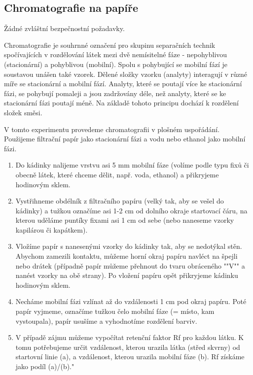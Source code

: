 \subsection{Chromatografie na papíře}


Žádné zvláštní bezpečnostní požadavky.

\hspace{-21px} 

Chromatografie je souhrnné označení pro skupinu separačních technik spočívajících v rozdělování látek mezi dvě nemísitelné fáze - nepohyblivou (stacionární) a pohyblivou (mobilní). Spolu s pohybující se mobilní fází je soustavou unášen také vzorek. Dělené složky vzorku (analyty) interagují v různé míře se stacionární a mobilní fází. Analyty, které se poutají více ke stacionární fázi, se pohybují pomaleji a jsou zadržovány déle, než analyty, které se ke stacionární fázi poutají méně. Na základě tohoto principu dochází k rozdělení složek směsi.

V tomto experimentu provedeme chromatografii v plošném uspořádání. Použijeme filtrační papír jako stacionární fázi a vodu nebo ethanol jako mobilní fázi. \newline

\hspace{-21px} 

\begin{enumerate}
\item Do kádinky nalijeme vrstvu asi 5 mm mobilní fáze (volíme podle typu fixů či obecně látek, které chceme dělit, např. voda, ethanol) a přikryjeme hodinovým sklem.
\item Vystřihneme obdélník z filtračního papíru (velký tak, aby se vešel do kádinky) a tužkou označíme asi 1-2 cm od dolního okraje startovací čáru, na kterou uděláme puntíky fixami asi 1 cm od sebe (nebo naneseme vzorky kapilárou či kapátkem).
\item Vložíme papír s nanesenými vzorky do kádinky tak, aby se nedotýkal stěn. Abychom zamezili kontaktu, můžeme horní okraj papíru navléct na špejli nebo drátek (případně papír můžeme přehnout do tvaru obráceného ""V"" a nanést vzorky na obě strany). Po vložení papíru opět přikryjeme kádinku hodinovým sklem.
\item Necháme mobilní fázi vzlínat až do vzdálenosti 1 cm pod okraj papíru. Poté papír vyjmeme, označíme tužkou čelo mobilní fáze (= místo, kam vystoupala), papír usušíme a vyhodnotíme rozdělení barviv.
\item V případě zájmu můžeme vypočítat retenční faktor Rf pro každou látku. K tomu potřebujeme určit vzdálenost, kterou urazila látka (střed skvrny) od startovní linie (a), a vzdálenost, kterou urazila mobilní fáze (b). Rf získáme jako podíl (a)/(b)."
\end{enumerate}
